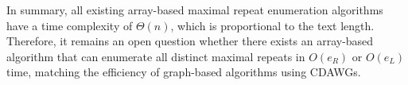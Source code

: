 In summary, all existing array-based maximal repeat enumeration algorithms have a time complexity of $\Theta(n)$, which is proportional to the text length. Therefore, it remains an open question whether there exists an array-based algorithm that can enumerate all distinct maximal repeats in $O(e_R)$ or $O(e_L)$ time, matching the efficiency of graph-based algorithms using CDAWGs.



